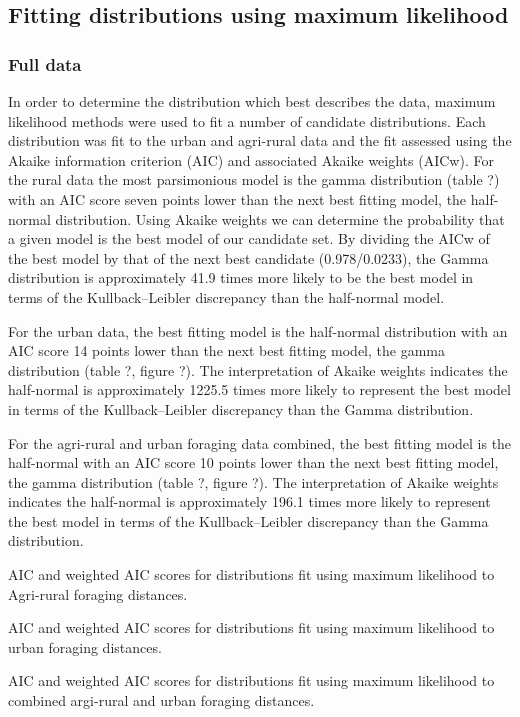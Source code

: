 \documentclass[11pt,usenames,dvipsnames]{article}
\begin{document}
\subsection{Fitting distributions using maximum likelihood}

\subsubsection{Full data}

\begin{linenumbers}
\hspace{\parindent}
In order to determine the distribution which best describes the data, maximum likelihood methods were used to fit a number of candidate distributions. Each distribution was fit to the urban and agri-rural data and the fit assessed using the Akaike information criterion (AIC) and associated Akaike weights (AICw). For the rural data the most parsimonious model is the gamma distribution (table ?) with an AIC score seven points lower than the next best fitting model, the half-normal distribution. Using Akaike weights we can determine the probability that a given model is the best model of our candidate set. By dividing the AICw of the best model by that of the next best candidate (0.978/0.0233), the Gamma distribution is approximately 41.9 times more likely to be the best model in terms of the Kullback–Leibler discrepancy than the half-normal model.

For the urban data, the best fitting model is the half-normal distribution with an AIC score 14 points lower than the next best fitting model, the gamma distribution (table ?, figure ?). The interpretation of Akaike weights indicates the half-normal is approximately 1225.5 times more likely to represent the best model in terms of the Kullback–Leibler discrepancy than the Gamma distribution.

For the agri-rural and urban foraging data combined, the best fitting model is the half-normal with an AIC score 10 points lower than the next best fitting model, the gamma distribution (table ?, figure ?). The interpretation of Akaike weights indicates the half-normal is approximately 196.1 times more likely to represent the best model in terms of the Kullback–Leibler discrepancy than the Gamma distribution.
\end{linenumbers}

\begin{table}[H]
	\centering
	\caption{AIC and weighted AIC scores for distributions fit using maximum likelihood to Agri-rural foraging distances.}
	
\end{table}
\begin{table}[H]
	\centering
	\caption{AIC and weighted AIC scores for distributions fit using maximum likelihood to urban foraging distances.}
	
\end{table}
\begin{table}[H]
	\centering
	\caption{AIC and weighted AIC scores for distributions fit using maximum likelihood to combined argi-rural and urban foraging distances.}
	
\end{table}
\end{document}
